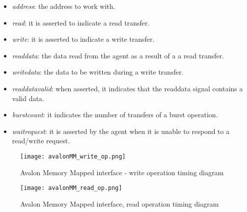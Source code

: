 \documentclass[10pt, english, a4paper, titlepage, oneside]{book}
\begin{document}
\begin{itemize}
    \item \textit{address}: the address to work with.
    \vspace{0.5mm}
    \item \textit{read}: it is asserted to indicate a read transfer.
    \vspace{0.5mm}
    \item \textit{write}: it is asserted to indicate a write transfer.
    \vspace{0.5mm}
    \item \textit{readdata}: the data read from the agent as a result of a a read transfer.
    \vspace{0.5mm}
    \item \textit{writedata}: the data to be written during a write transfer.
    \vspace{0.5mm}
    \item \textit{readdatavalid}: when asserted, it indicates that the readdata signal contains a valid data.
    \vspace{0.5mm}
    \item \textit{burstcount}: it indicates the number of transfers of a burst operation.
    \vspace{0.5mm}
    \item \textit{waitrequest}: it is asserted by the agent when it is unable to respond to a read/write request.
\end{itemize} 
\vspace{6mm}
\begin{figure}[H]
    \centering
    \texttt{[image: avalonMM\_write\_op.png]}
    \vspace{5mm}
    \caption{Avalon Memory Mapped interface - write operation timing diagram}
    \label{avalonMM_write_op}
\end{figure}
\vspace{6mm}
\begin{figure}[H]
    \centering
    \texttt{[image: avalonMM\_read\_op.png]}
    \vspace{5mm}
    \caption{Avalon Memory Mapped interface, read operation timing diagram}
    \label{avalonMM_read_op}
\end{figure}
\vspace{6mm}
\end{document}
